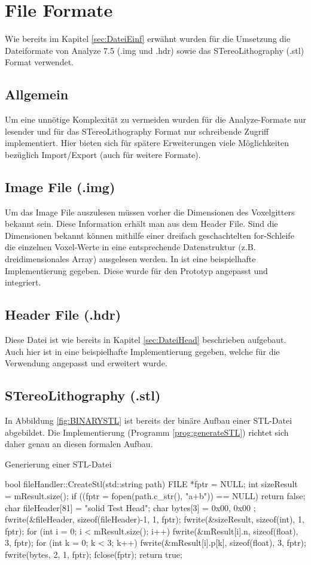 \section{File Formate}
Wie bereits im Kapitel \ref{sec:DateiEinf} erwähnt wurden für die Umsetzung die Dateiformate von Analyze 7.5 (.img und .hdr) sowie das STereoLithography (.stl) Format verwendet.
\subsection{Allgemein}
Um eine unnötige Komplexität zu vermeiden wurden für die Analyze-Formate nur lesender und für das STereoLithography Format nur schreibende Zugriff implementiert. Hier bieten sich für spätere Erweiterungen viele Möglichkeiten bezüglich Import/Export (auch für weitere Formate). 
\subsection{Image File (.img)}
Um das Image File auszulesen müssen vorher die Dimensionen des Voxelgitters bekannt sein.  Diese Information erhält man aus dem Header File. Sind die Dimensionen bekannt können mithilfe einer dreifach geschachtelten for-Schleife die einzelnen Voxel-Werte in eine entsprechende Datenstruktur (z.B. dreidimensionales Array) ausgelesen werden. In \citep{AnalyzeFormat} ist eine beispielhafte Implementierung gegeben. Diese wurde für den Prototyp angepasst und integriert.
\subsection{Header File (.hdr)}
Diese Datei ist wie bereits in Kapitel \ref{sec:DateiHead} beschrieben aufgebaut. Auch hier ist in \citep{AnalyzeFormat} eine beispielhafte Implementierung gegeben, welche für die Verwendung angepasst und erweitert wurde.
\subsection{STereoLithography (.stl)}
In Abbildung \ref{fig:BINARYSTL} ist bereits der binäre Aufbau einer STL-Datei abgebildet. Die Implementierung (Programm \ref{prog:generateSTL}) richtet sich daher genau an diesen formalen Aufbau.
\begin{program}
	\caption{Generierung einer STL-Datei}
	\label{prog:generateSTL}
	\begin{CCode}
		bool fileHandler::CreateStl(std::string path){
			FILE *fptr = NULL;	
			int sizeResult = mResult.size();
			if ((fptr = fopen(path.c_str(), "a+b")) == NULL)
				return false;
			char fileHeader[81] = "solid Test Head";
			char bytes[3] = { 0x00, 0x00 };
			fwrite(&fileHeader, sizeof(fileHeader)-1, 1, fptr);
			fwrite(&sizeResult, sizeof(int), 1, fptr);
			for (int i = 0; i < mResult.size(); i++) {
				fwrite(&mResult[i].n, sizeof(float), 3, fptr);
				for (int k = 0; k < 3; k++)  {
					fwrite(&mResult[i].p[k], sizeof(float), 3, fptr);
				}
				fwrite(bytes, 2, 1, fptr);
			}
			fclose(fptr);
			return true;
		}
	\end{CCode}
\end{program}
